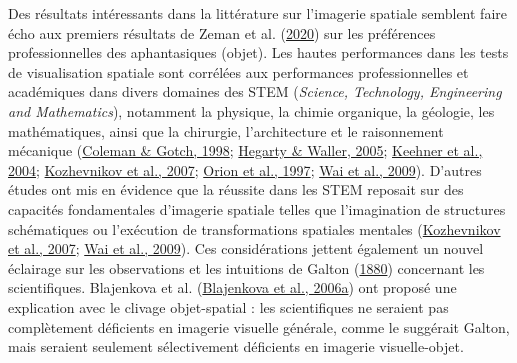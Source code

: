 \documentclass[
  12pt,
]{article}
\begin{document}
Des résultats intéressants dans la littérature sur l'imagerie spatiale
semblent faire écho aux premiers résultats de Zeman et al.
(\protect\hyperlink{ref-zemanPhantasiaPsychologicalSignificance2020}{2020})
sur les préférences professionnelles des aphantasiques (objet). Les
hautes performances dans les tests de visualisation spatiale sont
corrélées aux performances professionnelles et académiques dans divers
domaines des STEM (\emph{Science, Technology, Engineering and
Mathematics}), notamment la physique, la chimie organique, la géologie,
les mathématiques, ainsi que la chirurgie, l'architecture et le
raisonnement mécanique
(\protect\hyperlink{ref-colemanSpatialPerceptionSkills1998}{Coleman \&
Gotch, 1998};
\protect\hyperlink{ref-hegartyIndividualDifferencesSpatial2005}{Hegarty
\& Waller, 2005};
\protect\hyperlink{ref-keehnerSpatialAbilityExperience2004}{Keehner et
al., 2004};
\protect\hyperlink{ref-kozhevnikovSpatialVisualizationPhysics2007}{Kozhevnikov
et al., 2007};
\protect\hyperlink{ref-orionRelationshipEarthScienceEducation1997}{Orion
et al., 1997}; \protect\hyperlink{ref-waiSpatialAbilitySTEM2009}{Wai et
al., 2009}). D'autres études ont mis en évidence que la réussite dans
les STEM reposait sur des capacités fondamentales d'imagerie spatiale
telles que l'imagination de structures schématiques ou l'exécution de
transformations spatiales mentales
(\protect\hyperlink{ref-kozhevnikovSpatialVisualizationPhysics2007}{Kozhevnikov
et al., 2007}; \protect\hyperlink{ref-waiSpatialAbilitySTEM2009}{Wai et
al., 2009}). Ces considérations jettent également un nouvel éclairage
sur les observations et les intuitions de Galton
(\protect\hyperlink{ref-galtonSTATISTICSMENTALIMAGERY1880}{1880})
concernant les scientifiques. Blajenkova et al.
(\protect\hyperlink{ref-blajenkovaObjectSpatialImagery2006}{Blajenkova
et al., 2006a}) ont proposé une explication avec le clivage
objet-spatial : les scientifiques ne seraient pas complètement
déficients en imagerie visuelle générale, comme le suggérait Galton,
mais seraient seulement sélectivement déficients en imagerie
visuelle-objet.
\end{document}
